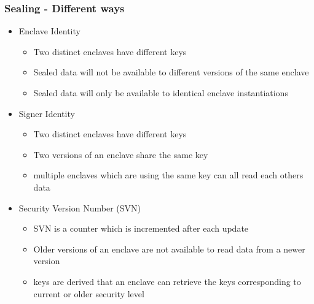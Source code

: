 \begin{frame}
    \frametitle{Sealing - Different ways}
    \begin{itemize}[<+->]
        \item Enclave Identity
        \begin{itemize}[<+->]
            \item Two distinct enclaves have different keys
            \item Sealed data will not be available to different versions of the same enclave
            \item Sealed data will only be available to identical enclave instantiations
        \end{itemize}
        \item Signer Identity
        \begin{itemize}[<+->]
            \item Two distinct enclaves have different keys
            \item Two versions of an enclave share the same key
            \item multiple enclaves which are using the same key can all read each others data
        \end{itemize}
        \item Security Version Number (SVN)
        \begin{itemize}[<+->]
            \item SVN is a counter which is incremented after each update
            \item Older versions of an enclave are not available to read data from a newer version
            \item keys are derived that an enclave can retrieve the keys corresponding to current or older security level
        \end{itemize}
    \end{itemize}

    

\end{frame}

